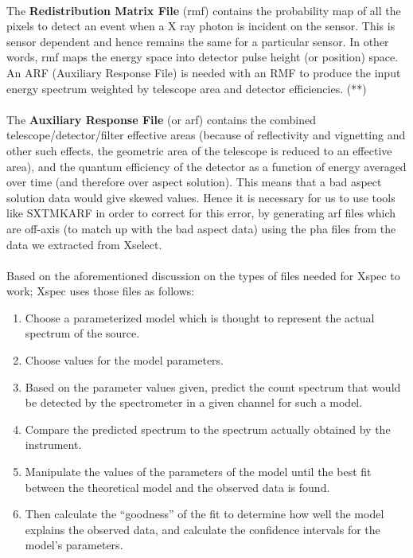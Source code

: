 \documentclass[a4paper,twoside]{report}
\numberwithin{equation}{section}
\begin{document}
\paragraph{}
The \textbf{Redistribution Matrix File} (rmf) contains the probability map of all the pixels to detect an event when a X ray photon is incident on the sensor. This is sensor dependent and hence remains the same for a particular sensor. In other words, rmf maps the energy space into detector pulse height (or position) space. An ARF (Auxiliary Response File) is needed with an RMF to produce the input energy spectrum  weighted by telescope area and detector efficiencies. (**)
\paragraph{}
The \textbf{Auxiliary Response File} (or arf) contains the combined telescope/detector/filter effective areas (because of reflectivity and vignetting and other such effects, the geometric area of the telescope is reduced to an effective area), and the quantum efficiency of the detector as a function of energy averaged over time (and therefore over aspect solution). This means that a bad aspect solution data would give skewed values. Hence it is necessary for us to use tools like SXTMKARF in order to correct for this error, by generating arf files which are off-axis (to match up with the bad aspect data) using the pha files from the data we extracted from Xselect. 
\paragraph{}
Based on the aforementioned discussion on the types of files needed for Xspec to work; Xspec uses those files as follows:
\begin{enumerate}
\item Choose a parameterized model which is thought to represent the actual
spectrum of the source.
\item Choose values for the model parameters.
\item Based on the parameter values given, predict the count spectrum that
would be detected by the spectrometer in a given channel for such a model.
\item Compare the predicted spectrum to the spectrum actually obtained by
the instrument.
\item Manipulate the values of the parameters of the model until the best fit
between the theoretical model and the observed data is found.
\item Then calculate the “goodness” of the fit to determine how well the model
explains the observed data, and calculate the confidence intervals for the
model’s parameters.
\end{enumerate}
\end{document}
